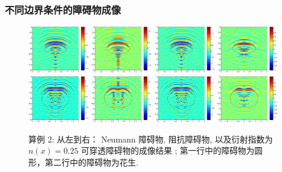 \documentclass[8pt]{beamer}
\begin{document}
\begin{frame}
\frametitle{不同边界条件的障碍物成像}
 \begin{figure}
 \centering
 \includegraphics[width=0.24\textwidth]{./graphic/circle_3pi.eps}
 \includegraphics[width=0.24\textwidth]{./graphic/circle_3pi_neumann.eps}
 \includegraphics[width=0.24\textwidth]{./graphic/circle_3pi_impedance_1.eps}
 \includegraphics[width=0.24\textwidth]{./graphic/circle_3pi_transmission.eps}
 \includegraphics[width=0.24\textwidth]{./graphic/peanut_3pi.eps}
 \includegraphics[width=0.24\textwidth]{./graphic/peanut_3pi_neumann.eps}
 \includegraphics[width=0.24\textwidth]{./graphic/peanut_3pi_impedance_1.eps}
 \includegraphics[width=0.24\textwidth]{./graphic/peanut_3pi_transmission.eps}
 \caption{算例 2: 从左到右： Neumann 障碍物, 阻抗障碍物, 以及衍射指数为$n(x)=0.25$ 可穿透障碍物的成像结果 ; 第一行中的障碍物为圆形，第二行中的障碍物为花生.}
 \end{figure}
\end{frame}
\end{document}
